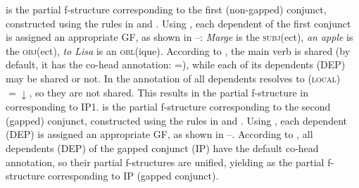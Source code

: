 \documentclass[output=paper]{../langscibook}
\begin{document}
 is the partial f-structure corresponding to
the first (non-gapped) conjunct, constructed using the rules in
 and . Using
, each dependent of the first conjunct
is assigned an appropriate GF, as shown in
–: \emph{Marge}
is the \textsc{subj}(ect), \emph{an apple} is the \textsc{obj}(ect), \emph{to Lisa} is an
\textsc{obl}(ique). According to , the main verb is shared
(by default, it has the co-head annotation:
{\DOWN=\UP}), while each of its dependents (DEP)
may be shared or not. In  the annotation of all
dependents resolves to \textsc{(\UP local)$=\downarrow$}, so
they are not shared. This results in the partial f-structure in
 corresponding to IP1.
\ea\label{ex:pat:prz:17:16:subj}
  \z
\ea\label{ex:pat:prz:17:16:obj}
  \z
\ea\label{ex:pat:prz:17:16:obl}
\z
{} is the partial f-structure corresponding to
the second (gapped) conjunct, constructed using the rules in
 and . Using
, each dependent (DEP) is assigned an
appropriate GF, as shown in
–. According
to , all dependents (DEP) of the gapped
conjunct (IP) have the default co-head annotation, so their partial
f-structures are unified, yielding  as the
partial f-structure corresponding to IP (gapped conjunct).
\ea\label{ex:pat:prz:17:18:C2:subj}
  \z
\end{document}
